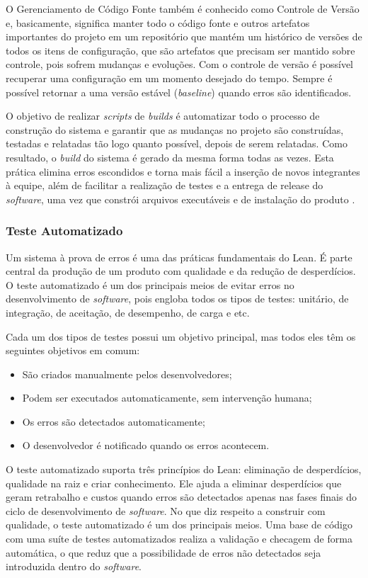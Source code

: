 O Gerenciamento de Código Fonte também é conhecido como Controle de Versão e, basicamente, significa manter todo o código fonte e outros artefatos importantes do projeto em um repositório que mantém um histórico de versões de todos os itens de configuração, que são artefatos que precisam ser mantido sobre controle, pois sofrem mudanças e evoluções. Com o controle de versão é possível recuperar uma configuração em um momento desejado do tempo. Sempre é possível retornar a uma versão estável (\textit{baseline}) quando erros são identificados.

O objetivo de realizar \textit{scripts} de \textit{builds} é automatizar todo o processo de construção do sistema e garantir que as mudanças no projeto são construídas, testadas e relatadas tão logo quanto possível, depois de serem relatadas. Como resultado, o \textit{build} do sistema é gerado da mesma forma todas as vezes. Esta prática elimina erros escondidos e torna mais fácil a inserção de novos integrantes à equipe, além de facilitar a realização de testes e a entrega de release do \textit{software}, uma vez que constrói arquivos executáveis e de instalação do produto \cite{hibbs2009}.

\subsubsection[Teste Automatizado]{Teste Automatizado}

Um sistema à prova de erros é uma das práticas fundamentais do Lean. É parte central da produção de um produto com qualidade e da redução de desperdícios. O teste automatizado é um dos principais meios de evitar erros no desenvolvimento de \textit{software}, pois engloba todos os tipos de testes: unitário, de integração, de aceitação, de desempenho, de carga e etc.

Cada um dos tipos de testes possui um objetivo principal, mas todos eles têm os seguintes objetivos em comum:
\begin{itemize}
\item São criados manualmente pelos desenvolvedores;
\item Podem ser executados automaticamente, sem intervenção humana;
\item Os erros são detectados automaticamente;
\item O desenvolvedor é notificado quando os erros acontecem.
\end{itemize}

O teste automatizado suporta três princípios do Lean: eliminação de desperdícios, qualidade na raiz e criar conhecimento. Ele ajuda a eliminar desperdícios que geram retrabalho e custos quando erros são detectados apenas nas fases finais do ciclo de desenvolvimento de \textit{software}. No que diz respeito a construir com qualidade, o teste automatizado é um dos principais meios. Uma base de código com uma suíte de testes automatizados realiza a validação e checagem de forma automática, o que reduz que a possibilidade de erros não detectados seja introduzida dentro do \textit{software}.

